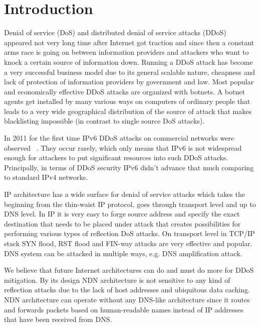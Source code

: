 \section{Introduction}
\label{sec:intro}


Denial of service (DoS) and distributed denial of service attacks (DDoS) appeared not very long time after Internet got traction and since then a constant arms race is going on between information providers and attackers who want to knock a certain source of information down. Running a DDoS attack has become a very successful business model due to its general scalable nature, cheapness and lack of protection of information providers by government and law. Most popular and economically effective DDoS attacks are organized with botnets. A botnet agents get installed by many various ways on computers of ordinary people that leads to a very wide geographical distribution of the source of attack that makes blacklisting impossible (in contrast to single source DoS attacks).

In 2011 for the first time IPv6 DDoS attacks on commercial networks were observed ~\cite{Arbor}. They occur rarely, which only means that IPv6 is not widespread enough for attackers to put significant resources into such DDoS attacks. Principally, in terms of DDoS security IPv6 didn't advance that much comparing to standard IPv4 networks.

IP architecture has a wide surface for denial of service attacks which takes the beginning from the thin-waist IP protocol, goes through transport level and up to DNS level. In IP it is very easy to forge source address and specify the exact destination that needs to be placed under attack that creates possibilities for performing various types of reflection DoS attacks. On transport level in TCP/IP stack SYN flood, RST flood and FIN-way attacks are very effective and popular. DNS system can be attacked in multiple ways, e.g. DNS amplification attack. 

We believe that future Internet architectures can do and must do more for DDoS mitigation. By its design NDN architecture is not sensitive to any kind of reflection attacks due to the lack of host addresses and ubiquitous data caching. NDN architecture can operate without any DNS-like architecture since it routes and forwards packets based on human-readable names instead of IP addresses that have been received from DNS. 
  
